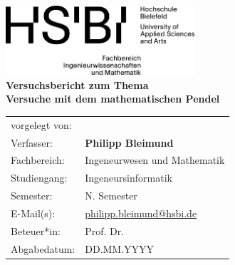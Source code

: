 \author{}

\begin{titlepage}
    \begin{center}
        \includegraphics[width=7cm]{images/HSBI-Logo.png}\\ [10ex]
        \LARGE{\textbf{Versuchsbericht zum Thema}}\\[3ex]
        \huge{\textbf{Versuche mit dem mathematischen Pendel}}\\[20ex]
        \normalsize{}
        \begin{tabular}{ll}
            vorgelegt von:        & \\
            Verfasser:            & \quad \textbf{Philipp Bleimund}     \\[2ex]
            Fachbereich:          & \quad Ingeneurwesen und Mathematik \\[1ex]
            Studiengang:          & \quad Ingeneursinformatik \\[1ex]
            Semester:             & \quad N. Semester \\[1ex]
            E-Mail(s):            & \quad \href{mailto:philipp.bleimund@hsbi.de}{philipp.bleimund@hsbi.de} \\[1ex]
            Beteuer*in:           & \quad Prof. Dr.           \\ [1ex]
            Abgabedatum:          & \quad DD.MM.YYYY                       \\[1ex]
        \end{tabular}
    \end{center}
\end{titlepage}